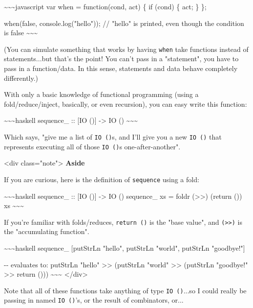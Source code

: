 \documentclass[]{article}
\begin{document}
\textasciitilde{}\textasciitilde{}\textasciitilde{}javascript var when =
function(cond, act) \{ if (cond) \{ act; \} \};

when(false, console.log("hello")); // "hello" is printed, even though the
condition is false \textasciitilde{}\textasciitilde{}\textasciitilde{}

(You can simulate something that works by having \texttt{when} take functions
instead of statements...but that's the point! You can't pass in a "statement",
you have to pass in a function/data. In this sense, statements and data behave
completely differently.)

With only a basic knowledge of functional programming (using a
fold/reduce/inject, basically, or even recursion), you can easy write this
function:

\textasciitilde{}\textasciitilde{}\textasciitilde{}haskell sequence\_ :: {[}IO
(){]} -\textgreater{} IO () \textasciitilde{}\textasciitilde{}\textasciitilde{}

Which says, "give me a list of \texttt{IO\ ()}s, and I'll give you a new
\texttt{IO\ ()} that represents executing all of those \texttt{IO\ ()}s
one-after-another".

\textless{}div class="note"\textgreater{} \textbf{Aside}

If you are curious, here is the definition of \texttt{sequence} using a fold:

\textasciitilde{}\textasciitilde{}\textasciitilde{}haskell sequence\_ :: {[}IO
(){]} -\textgreater{} IO () sequence\_ xs = foldr (\textgreater{}\textgreater{})
(return ()) xs \textasciitilde{}\textasciitilde{}\textasciitilde{}

If you're familiar with folds/reduces, \texttt{return\ ()} is the "base value",
and \texttt{(\textgreater{}\textgreater{})} is the "accumulating function".

\textasciitilde{}\textasciitilde{}\textasciitilde{}haskell sequence\_
{[}putStrLn "hello", putStrLn "world", putStrLn "goodbye!"{]}

-\/- evaluates to: putStrLn "hello" \textgreater{}\textgreater{} (putStrLn
"world" \textgreater{}\textgreater{} (putStrLn "goodbye!"
\textgreater{}\textgreater{} return ()))
\textasciitilde{}\textasciitilde{}\textasciitilde{}
\textless{}/div\textgreater{}

Note that all of these functions take anything of type \texttt{IO\ ()}...so I
could really be passing in named \texttt{IO\ ()}'s, or the result of
combinators, or...
\end{document}

